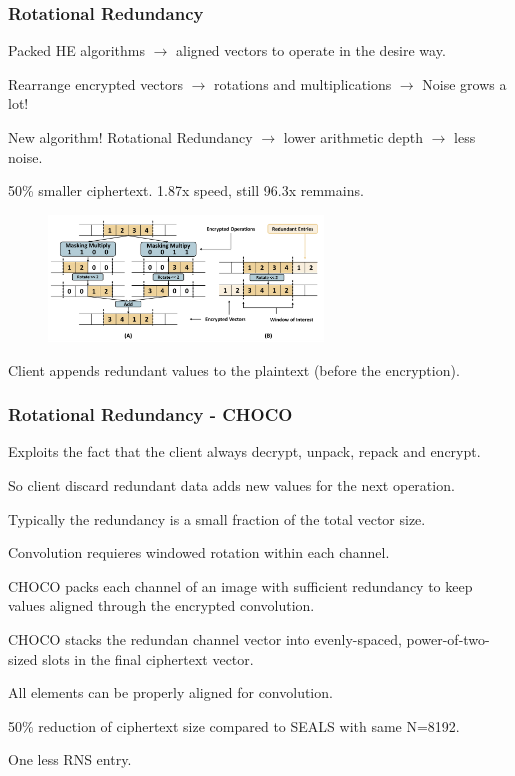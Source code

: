 \documentclass[10pt,handout]{beamer}
\begin{document}


\begin{frame}
\frametitle{Rotational Redundancy}

Packed HE algorithms $\rightarrow$  aligned vectors to operate in the desire way.

    Rearrange encrypted vectors $\rightarrow$ rotations and multiplications  $\rightarrow$ Noise grows a lot!

New algorithm! Rotational Redundancy $\rightarrow$ lower arithmetic depth $\rightarrow$ less noise.

50\% smaller ciphertext. 1.87x speed, still 96.3x remmains.
\begin{figure}
    \includegraphics[width=0.65\textwidth]{rotation.png}
\end{figure}


    Client appends redundant values to the plaintext (before the encryption).

\end{frame}



\begin{frame}
\frametitle{Rotational Redundancy - CHOCO}
Exploits the fact that the client  always decrypt, unpack, repack and encrypt.

So client discard redundant data adds new values for the next operation.

Typically the redundancy is a small fraction of the total vector size.

Convolution requieres windowed rotation within each channel.

CHOCO packs each channel of an image with sufficient redundancy to keep
values aligned through the encrypted convolution.

CHOCO stacks the redundan channel vector into evenly-spaced, power-of-two-sized slots in the final ciphertext vector.

All elements can be properly aligned for convolution.

50\% reduction of ciphertext size compared to SEALS with same N=8192.

One less  RNS entry.
\end{frame}
\end{document}
